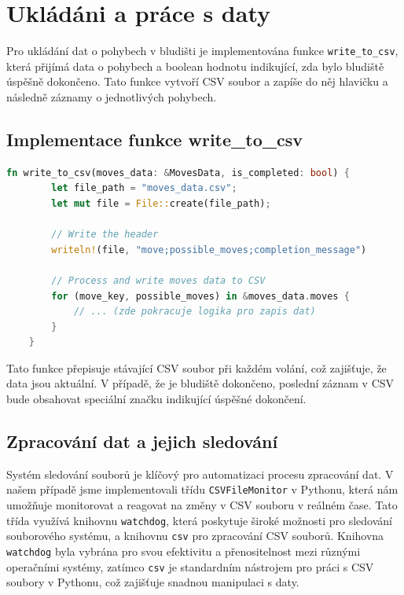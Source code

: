 \documentclass[12pt, a4paper,
twoside,        %
openright
]{report}
\begin{document}
\section{Ukládáni a práce s daty}

Pro ukládání dat o pohybech v bludišti je implementována funkce \texttt{write\_to\_csv}, která přijímá data o pohybech a boolean hodnotu indikující, zda bylo bludiště úspěšně dokončeno. Tato funkce vytvoří CSV soubor a zapíše do něj hlavičku a následně záznamy o jednotlivých pohybech.


\subsection{Implementace funkce write\_to\_csv}

\begin{lstlisting}[language=rust, caption={Funkce pro zápis do CSV souboru}]
	fn write_to_csv(moves_data: &MovesData, is_completed: bool) {
		let file_path = "moves_data.csv";
		let mut file = File::create(file_path);
		
		// Write the header
		writeln!(file, "move;possible_moves;completion_message")
		
		// Process and write moves data to CSV
		for (move_key, possible_moves) in &moves_data.moves {
			// ... (zde pokracuje logika pro zapis dat)
		}
	}
\end{lstlisting}

Tato funkce přepisuje stávající CSV soubor při každém volání, což zajišťuje, že data jsou aktuální. V případě, že je bludiště dokončeno, poslední záznam v CSV bude obsahovat speciální značku indikující úspěšné dokončení.

\newpage
\subsection{Zpracování dat a jejich sledování}

Systém sledování souborů je klíčový pro automatizaci procesu zpracování dat. V našem případě jsme implementovali třídu \texttt{CSVFileMonitor} v Pythonu, která nám umožňuje monitorovat a reagovat na změny v CSV souboru v reálném čase. Tato třída využívá knihovnu \texttt{watchdog}, která poskytuje široké možnosti pro sledování souborového systému, a knihovnu \texttt{csv} pro zpracování CSV souborů. Knihovna \texttt{watchdog} byla vybrána pro svou efektivitu a přenositelnost mezi různými operačními systémy, zatímco \texttt{csv} je standardním nástrojem pro práci s CSV soubory v Pythonu, což zajišťuje snadnou manipulaci s daty.
\end{document}
